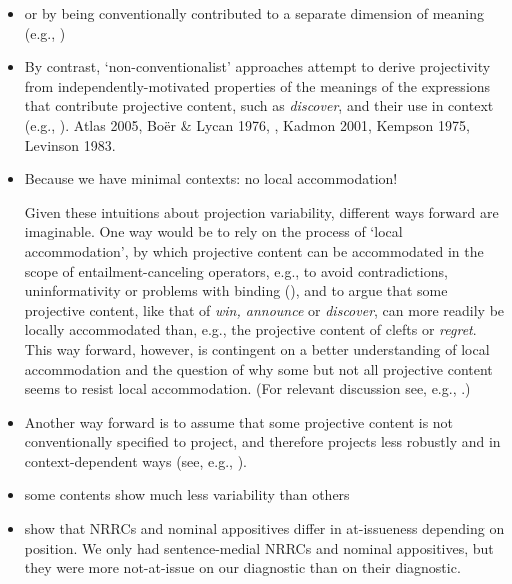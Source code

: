 \documentclass[11pt,fleqn]{article}
\newcommand{\6}{\mbox{$[\hspace*{-.6mm}[$}}
\newcommand{\9}{\mbox{$]\hspace*{-.6mm}]$}}
\begin{document}
\begin{itemize}

\item or by being conventionally contributed to a separate dimension of meaning (e.g., \citealt{karttunen-peters79,potts05})


\item By contrast, `non-conventionalist' approaches attempt to derive projectivity from independently-motivated properties of the meanings of the expressions that contribute projective content, such as {\em discover}, and their use in context (e.g., \citealt{stalnaker74,wilson75,simons01,simons04,abusch10,abrusan2011,best-question}). Atlas  2005,  Bo\"er  \&  Lycan  1976,  \citealt{ccmg90},  Kadmon  2001,  Kempson 1975, Levinson 1983. 

\item Because we have minimal contexts: no local accommodation!

Given these intuitions about projection variability, different ways forward are imaginable. One way would be to rely on the process of `local accommodation', by which projective content can be accommodated in the scope of entailment-canceling operators, e.g., to avoid contradictions, uninformativity or problems with binding (\citealt{heim83,vds92}), and to argue that some projective content, like that of {\em win, announce} or {\em discover}, can more readily be locally accommodated than, e.g., the projective content of clefts or {\em regret}. This way forward, however, is contingent on a better understanding of local accommodation and the question of why some but not all projective content seems to resist local accommodation. (For relevant discussion see, e.g., \citealt{beaver-zeevat07}.) 

\item Another way forward is to assume that some projective content is not conventionally specified to project, and therefore projects less robustly and in context-dependent ways (see, e.g., \citealt{simons01,abusch10,abrusan2011,best-question}).



\item some contents show much less variability than others

\item \citealt{syrett-koev2015} show that NRRCs and nominal appositives differ in at-issueness depending on position. We only had sentence-medial NRRCs and nominal appositives, but they were more not-at-issue on our diagnostic than on their diagnostic.

\end{itemize}
\end{document}

